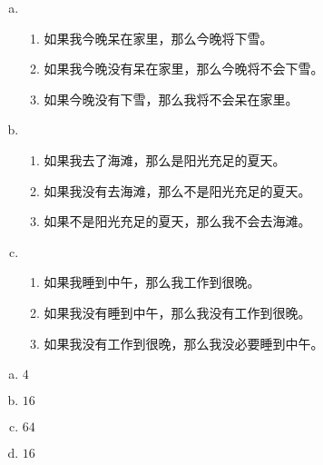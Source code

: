 {{        %
        \begin{practices}
            \begin{enumerate}[a)]
                \item
                {
                    \begin{enumerate}[1.]
                        \item 如果我今晚呆在家里，那么今晚将下雪。
                        \item 如果我今晚没有呆在家里，那么今晚将不会下雪。
                        \item 如果今晚没有下雪，那么我将不会呆在家里。
                    \end{enumerate}
                }
                \item
                {
                    \begin{enumerate}[1.]
                        \item 如果我去了海滩，那么是阳光充足的夏天。
                        \item 如果我没有去海滩，那么不是阳光充足的夏天。
                        \item 如果不是阳光充足的夏天，那么我不会去海滩。
                    \end{enumerate}
                }
                \item
                {
                    \begin{enumerate}[1.]
                        \item 如果我睡到中午，那么我工作到很晚。
                        \item 如果我没有睡到中午，那么我没有工作到很晚。
                        \item 如果我没有工作到很晚，那么我没必要睡到中午。
                    \end{enumerate}
                }
            \end{enumerate}
        \end{practices}

        \begin{practices}
            \begin{enumerate}[a)]
                \item $4$
                \item $16$
                \item $64$
                \item $16$
            \end{enumerate}
        \end{practices}
        
}}
